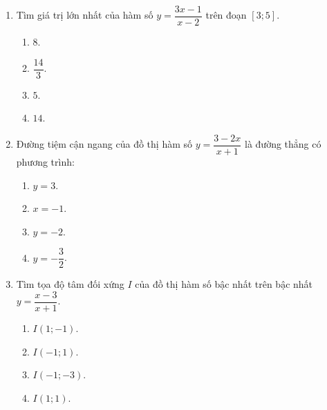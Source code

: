 \documentclass[12pt]{article}
\begin{document}
\begin{enumerate}[label=\textbf{Câu \arabic*.}, leftmargin=*]
\begin{center}
		\end{center}
		Gọi $M, m$ lần lượt là giá trị lớn nhất và giá trị nhỏ nhất của hàm số trên đoạn $[-1; 3]$. Tính giá trị của biểu thức $H = M - m$.
		\begin{multicols}{4}
			\begin{enumerate}[label=\Alph*.]
				\item $2$.
				\item $5$.
				\item $4$.
				\item $6$.
			\end{enumerate}
		\end{multicols}
		
		\item Tìm giá trị lớn nhất của hàm số $y = \dfrac{3x - 1}{x - 2}$ trên đoạn $[3; 5]$.
		\begin{multicols}{4}
			\begin{enumerate}[label=\Alph*.]
				\item $8$.
				\item $\dfrac{14}{3}$.
				\item $5$.
				\item $14$.
			\end{enumerate}
		\end{multicols}
		
		\item Đường tiệm cận ngang của đồ thị hàm số $y = \dfrac{3 - 2x}{x + 1}$ là đường thẳng có phương trình:
		\begin{multicols}{4}
			\begin{enumerate}[label=\Alph*.]
				\item $y = 3$.
				\item $x = -1$.
				\item $y = -2$.
				\item $y = -\dfrac{3}{2}$.
			\end{enumerate}
		\end{multicols}
		
		\item Tìm tọa độ tâm đối xứng $I$ của đồ thị hàm số bậc nhất trên bậc nhất $y = \dfrac{x-3}{x+1}$.
		\begin{multicols}{4}
			\begin{enumerate}[label=\Alph*.]
				\item $I(1; -1)$.
				\item $I(-1; 1)$.
				\item $I(-1; -3)$.
				\item $I(1; 1)$.
			\end{enumerate}
		\end{multicols}
		

\end{enumerate}
\end{document}
